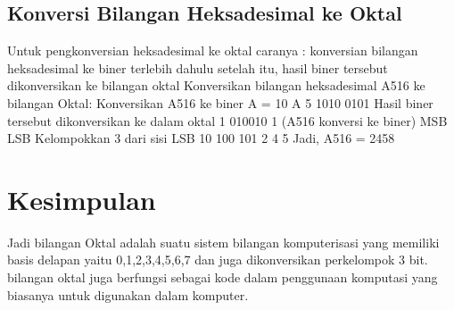 	\subsection {Konversi Bilangan Heksadesimal ke Oktal}
	Untuk pengkonversian heksadesimal
	ke oktal caranya :
	konversian bilangan heksadesimal ke biner terlebih dahulu
	setelah itu, hasil biner tersebut dikonversikan ke bilangan oktal
	Konversikan bilangan heksadesimal
	A516 ke bilangan Oktal:
	Konversikan A516 ke biner
 	A = 10
  	A        5               
       1010   0101 
	Hasil biner tersebut dikonversikan ke dalam oktal
  	1   010010  1 (A516 konversi ke biner)
 	MSB           LSB
	Kelompokkan 3 dari sisi LSB
 	10    100   101
         2        4       5
	Jadi, A516  =  2458

\section {Kesimpulan}

	Jadi bilangan Oktal adalah suatu sistem bilangan komputerisasi yang memiliki basis delapan yaitu 0,1,2,3,4,5,6,7 dan juga dikonversikan perkelompok 3 bit.
	bilangan oktal juga berfungsi sebagai kode dalam penggunaan komputasi yang biasanya untuk digunakan dalam komputer. 